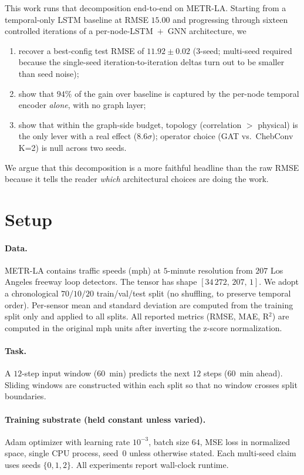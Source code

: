 \documentclass{article}
\begin{document}
This work runs that decomposition end-to-end on METR-LA. Starting from a temporal-only LSTM baseline at RMSE $15.00$ and progressing through sixteen controlled iterations of a per-node-LSTM~$+$~GNN architecture, we
\begin{enumerate}[itemsep=0pt,topsep=2pt]
    \item recover a best-config test RMSE of $11.92 \pm 0.02$ (3-seed; multi-seed required because the single-seed iteration-to-iteration deltas turn out to be smaller than seed noise);
    \item show that $94\%$ of the gain over baseline is captured by the per-node temporal encoder \emph{alone}, with no graph layer;
    \item show that within the graph-side budget, topology (correlation $>$ physical) is the only lever with a real effect (8.6$\sigma$); operator choice (GAT vs.\ ChebConv K=2) is null across two seeds.
\end{enumerate}
We argue that this decomposition is a more faithful headline than the raw RMSE because it tells the reader \emph{which} architectural choices are doing the work.

\section{Setup}
\label{sec:setup}

\paragraph{Data.}
METR-LA \cite{li2018dcrnn} contains traffic speeds (mph) at $5$-minute resolution from $207$ Los Angeles freeway loop detectors. The tensor has shape $[34\,272,\, 207,\, 1]$. We adopt a chronological $70/10/20$ train/val/test split (no shuffling, to preserve temporal order). Per-sensor mean and standard deviation are computed from the training split only and applied to all splits. All reported metrics (RMSE, MAE, R$^2$) are computed in the original mph units after inverting the z-score normalization.

\paragraph{Task.}
A $12$-step input window ($60$~min) predicts the next $12$ steps ($60$~min ahead). Sliding windows are constructed within each split so that no window crosses split boundaries.

\paragraph{Training substrate (held constant unless varied).}
Adam optimizer with learning rate $10^{-3}$, batch size $64$, MSE loss in normalized space, single CPU process, seed~$0$ unless otherwise stated. Each multi-seed claim uses seeds $\{0, 1, 2\}$. All experiments report wall-clock runtime.
\end{document}
